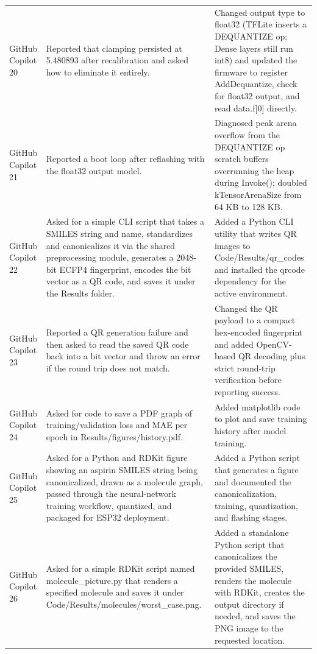 {\begin{longtable}{p{} p{} p{}}
    GitHub Copilot 20 & Reported that clamping persisted at 5.480893 after recalibration and asked how to eliminate it entirely. & Changed output type to float32 (TFLite inserts a DEQUANTIZE op; Dense layers still run int8) and updated the firmware to register AddDequantize, check for float32 output, and read data.f{[0]} directly. \\
    GitHub Copilot 21 & Reported a boot loop after reflashing with the float32 output model. & Diagnosed peak arena overflow from the DEQUANTIZE op scratch buffers overrunning the heap during Invoke(); doubled kTensorArenaSize from 64 KB to 128 KB. \\
    GitHub Copilot 22 & Asked for a simple CLI script that takes a SMILES string and name, standardizes and canonicalizes it via the shared preprocessing module, generates a 2048-bit ECFP4 fingerprint, encodes the bit vector as a QR code, and saves it under the Results folder. & Added a Python CLI utility that writes QR images to Code/Results/qr\_codes and installed the qrcode dependency for the active environment. \\
    GitHub Copilot 23 & Reported a QR generation failure and then asked to read the saved QR code back into a bit vector and throw an error if the round trip does not match. & Changed the QR payload to a compact hex-encoded fingerprint and added OpenCV-based QR decoding plus strict round-trip verification before reporting success. \\
    GitHub Copilot 24 & Asked for code to save a PDF graph of training/validation loss and MAE per epoch in Results/figures/history.pdf. & Added matplotlib code to plot and save training history after model training. \\
    GitHub Copilot 25 & Asked for a Python and RDKit figure showing an aspirin SMILES string being canonicalized, drawn as a molecule graph, passed through the neural-network training workflow, quantized, and packaged for ESP32 deployment. & Added a Python script that generates a figure and documented the canonicalization, training, quantization, and flashing stages. \\
    GitHub Copilot 26 & Asked for a simple RDKit script named molecule\_picture.py that renders a specified molecule and saves it under Code/Results/molecules/worst\_case.png. & Added a standalone Python script that canonicalizes the provided SMILES, renders the molecule with RDKit, creates the output directory if needed, and saves the PNG image to the requested location. \\
\end{longtable}
}
